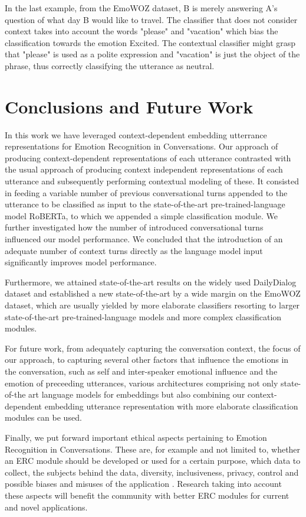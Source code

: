 \documentclass[11pt]{article}
\begin{document}
In the last example, from the EmoWOZ dataset, B is merely answering A's question of what day B would like to travel. The classifier that does not consider context takes into account the words "please" and "vacation" which bias the classification towards the emotion Excited. The contextual classifier might grasp that "please" is used as a polite expression and "vacation" is just the object of the phrase, thus correctly classifying the utterance as neutral.


\section{Conclusions and Future Work}

In this work we have leveraged context-dependent embedding utterrance representations for Emotion Recognition in Conversations. Our approach of producing context-dependent representations of each utterance contrasted with the usual approach of producing context independent representations of each utterance and subsequently performing contextual modeling of these. It consisted in feeding a variable number of previous conversational turns appended to the utterance to be classified as input to the state-of-the-art pre-trained-language model RoBERTa, to which we appended a simple classification module. We further investigated how the number of introduced conversational turns influenced our model performance.
We concluded that the introduction of an adequate number of context turns directly as the language model input significantly improves model performance.

Furthermore, we attained state-of-the-art results on the widely used DailyDialog dataset and established a new state-of-the-art by a wide margin on the EmoWOZ dataset, which are usually yielded by more elaborate classifiers resorting to larger state-of-the-art pre-trained-language models and more complex classification modules. 

For future work, from adequately capturing the conversation context, the focus of our approach, to capturing several other factors that influence the emotions in the conversation, such as self and inter-speaker emotional influence and the emotion of preceeding utterances, various architectures comprising not only state-of-the art language models for embeddings but also combining our context-dependent embedding utterance representation with more elaborate classification modules can be used.

Finally, we put forward important ethical aspects pertaining to Emotion Recognition in Conversations. These are, for example and not limited to, whether an ERC module should be developed or used for a certain purpose, which data to collect, the subjects behind the data, diversity, inclusiveness, privacy, control and possible biases and misuses of the application \cite{mohammad2022ethics}. Research taking into account these aspects will benefit the community with better ERC modules for current and novel applications.
\end{document}
